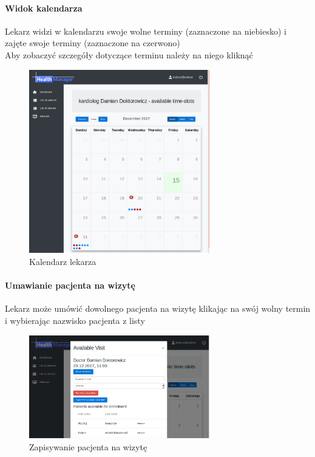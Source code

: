 \documentclass[polish,12pt]{aghthesis}
\begin{document}
    \paragraph{Widok kalendarza} { Lekarz widzi w kalendarzu swoje wolne terminy (zaznaczone na niebiesko) i zajęte swoje terminy (zaznaczone na czerwono) \\
    Aby zobaczyć szczegóły dotyczące terminu należy na niego kliknąć
        \begin{figure}[H]
        \includegraphics[width=0.7\textwidth]{gui-doc-cal}
        \caption{Kalendarz lekarza}
        \end{figure}  
        }
    \paragraph{Umawianie pacjenta na wizytę}{
    Lekarz może umówić dowolnego pacjenta na wizytę klikając na swój wolny termin i wybierając nazwisko pacjenta z listy
        \begin{figure}[H]
        \includegraphics[width=0.7\textwidth]{gui-doc-unenrolled}
        \caption{Zapisywanie pacjenta na wizytę}
        \end{figure}  
    }
\end{document}
